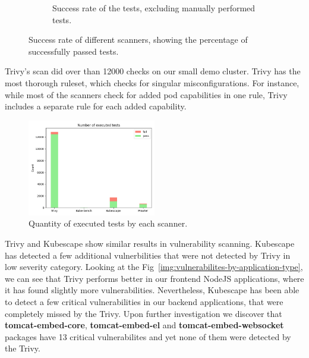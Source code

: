 \begin{figure}[!h]
\begin{subfigure}{.4\textwidth}
        \caption{Success rate of the tests, excluding manually performed tests.}
        \label{img:success-rate-no-manual}
        \end{subfigure}
        \caption{Success rate of different scanners, showing the percentage of successfully passed tests.}
        \label{fig:success-rates}
\end{figure}

Trivy's scan did over than 12000 checks on our small demo cluster. Trivy has the most thorough ruleset, which checks for singular misconfigurations. For instance, while most of the scanners check for added pod capabilities in one rule, Trivy includes a separate rule for each added capability.

\begin{figure}[!hbt]
	\begin{center}
		\includegraphics[width=0.5\textwidth]{images/number-of-checks.png}
        \caption{Quantity of executed tests by each scanner.}
		\label{img:number-of-checks}
	\end{center}
\end{figure}

Trivy and Kubescape show similar results in vulnerability scanning. Kubescape has detected a few additional vulnerbilities that were not detected by Trivy in low severity category. Looking at the Fig~\ref{img:vulnerabilites-by-application-type}, we can see that Trivy performs better in our frontend NodeJS applications, where it has found slightly more vulnerabilities. Nevertheless, Kubescape has been able to detect a few critical vulnerabilities in our backend applications, that were completely missed by the Trivy. Upon further investigation we discover that \textbf{tomcat-embed-core}, \textbf{tomcat-embed-el} and \textbf{tomcat-embed-websocket} packages have 13 critical vulnerabilites and yet none of them were detected by the Trivy. 

